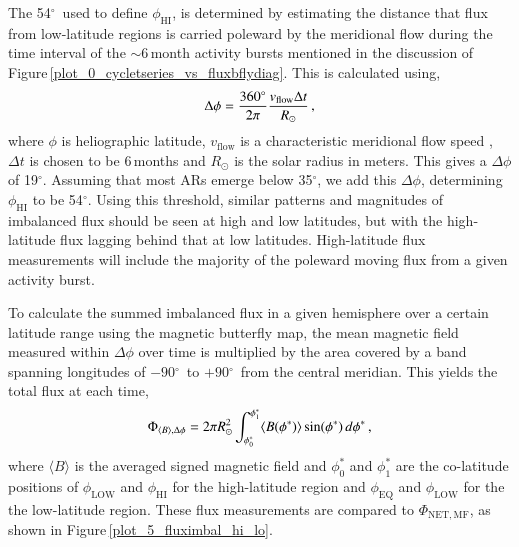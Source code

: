 \documentclass[namedreferences]{solarphysics}
\newcommand{\degr}{\ensuremath{^\circ}}
\begin{document}
\begin{article}
The 54\degr\ used to define $\phi_\mathrm{HI}$, is determined by estimating the distance that flux from low-latitude regions is carried poleward by the meridional flow during the time interval of the $\sim$6\,month activity bursts mentioned in the discussion of Figure\,\ref{plot_0_cycletseries_vs_fluxbflydiag}. This is calculated using,
\begin{equation}
\Delta \phi = \frac{360^{\circ}}{2\pi} \frac{v_{\mathrm{flow}}\Delta t}{R_{\odot}} \mbox{\,,}
\end{equation}
where $\phi$ is heliographic latitude, $v_{\mathrm{flow}}$ is a characteristic meridional flow speed \citep[chosen to be 15\,m\,s$^{-1}$ from measurements in][]{Hathaway:2010}, $\Delta t$ is chosen to be 6\,months and $R_{\odot}$ is the solar radius in meters. This gives a $\Delta \phi$ of 19$^\circ$. Assuming that most ARs emerge below 35$^{\circ}$, we add this $\Delta \phi$, determining $\phi_\mathrm{HI}$ to be 54$^\circ$. 
Using this threshold, similar patterns and magnitudes of imbalanced flux should be seen at high and low latitudes, but with the high-latitude flux lagging behind that at low latitudes. High-latitude flux measurements will include the majority of the poleward moving flux from a given activity burst.

To calculate the summed imbalanced flux in a given hemisphere over a certain latitude range using the magnetic butterfly map, the mean magnetic field measured within $\Delta \phi$ over time is multiplied by the area covered by a band spanning longitudes of $-90$\degr\ to $+90$\degr\ from the central meridian. This yields the total flux at each time,
\begin{equation}
\Phi_{\langle B \rangle,\Delta\phi}= 2\pi R_{\odot}^2 \int_{\phi^*_{0}}^{\phi^*_{1}} \langle B(\phi^*) \rangle \sin(\phi^*)\,d\phi^* \mbox{\,,} %
\end{equation}
where $\langle B \rangle$ is the averaged signed magnetic field and $\phi^*_{0}$ and $\phi^*_{1}$ are the co-latitude positions of $\phi_\mathrm{LOW}$ and $\phi_\mathrm{HI}$ for the high-latitude region and $\phi_\mathrm{EQ}$ and $\phi_\mathrm{LOW}$ for the the low-latitude region. These flux measurements are compared to $\Phi_{\mathrm{NET,MF}}$, as shown in Figure\,\ref{plot_5_fluximbal_hi_lo}.


\end{article}
\end{document}
